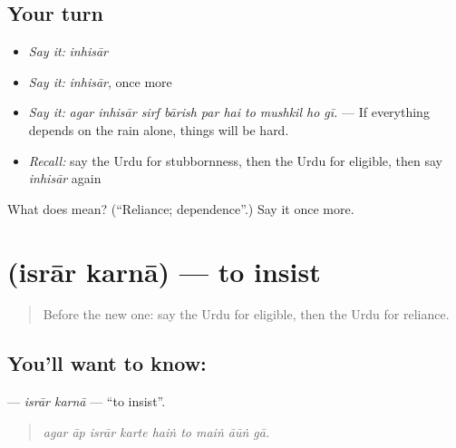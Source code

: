 \subsection*{Your turn}
\begin{itemize}
\raggedright
  \item \emph{Say it:} \emph{inhisār}
  \item \emph{Say it:} \emph{inhisār}, once more
  \item \emph{Say it:} \emph{agar inhisār sirf bārish par hai to mushkil ho gī.} — If everything depends on the rain alone, things will be hard.
  \item \emph{Recall:} say the Urdu for stubbornness, then the Urdu for eligible, then say \emph{inhisār} again
\end{itemize}

\begin{tcolorbox}[breakable,colback=teal!4,colframe=teal!35!black,title={Before you move on}]
What does  mean? (\textquotedblleft{}Reliance; dependence\textquotedblright{}.) Say it once more.
\end{tcolorbox}
\section[\texorpdfstring{\ur{اصرار} \ur{کرنا} (isrār karnā)}{اصرار کرنا (isrār karnā)}]{  (isrār karnā) — to insist}

\label{lesson:UR-C374-israr-karna}



\begin{quote}
Before the new one: say the Urdu for eligible, then the Urdu for reliance.
\end{quote}

\subsection*{You'll want to know:  }
\textbf{ } — \emph{isrār karnā} — \textquotedblleft{}to insist\textquotedblright{}.

\begin{quote}
        
\end{quote}

\begin{quote}
\emph{agar āp isrār karte haiṅ to maiṅ āūṅ gā.}
\end{quote}

